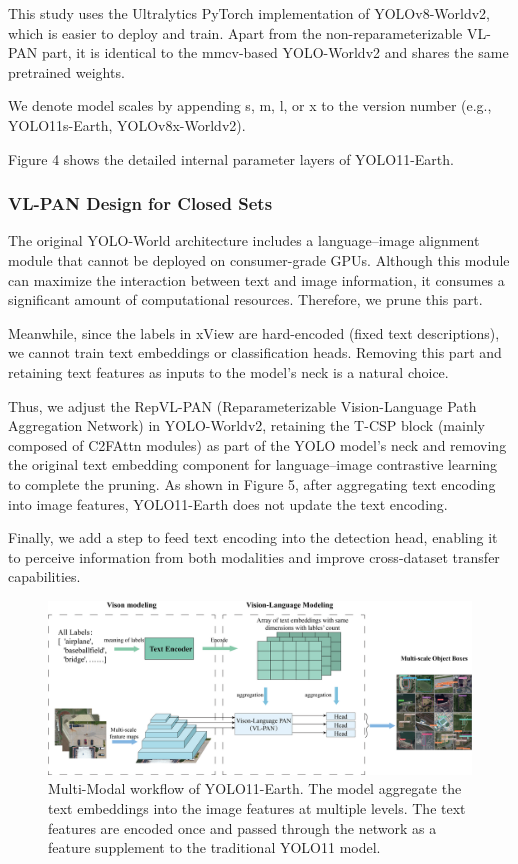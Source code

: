 \documentclass{article}
\begin{document}
This study uses the Ultralytics PyTorch implementation of YOLOv8-Worldv2, which is easier to deploy and train.  
Apart from the non-reparameterizable VL-PAN part, it is identical to the mmcv-based YOLO-Worldv2 and shares  
the same pretrained weights.

We denote model scales by appending s, m, l, or x to the version number (e.g., YOLO11s-Earth, YOLOv8x-Worldv2).

Figure 4 shows the detailed internal parameter layers of YOLO11-Earth.

\subsubsection{VL-PAN Design for Closed Sets}
The original YOLO-World architecture includes a
language–image alignment module that cannot be
deployed on consumer-grade GPUs. Although this
module can maximize the interaction between text
and image information, it consumes a significant
amount of computational resources. Therefore,
we prune this part.

Meanwhile, since the labels in xView are
hard-encoded (fixed text descriptions), we cannot
train text embeddings or classification heads.
Removing this part and retaining text features as
inputs to the model’s neck is a natural choice.

Thus, we adjust the RepVL-PAN
(Reparameterizable Vision-Language Path
Aggregation Network) in YOLO-Worldv2, retaining
the T-CSP block (mainly composed of C2FAttn modules)
as part of the YOLO model’s neck and removing the
original text embedding component for language–image
contrastive learning to complete the pruning. 
As shown in Figure 5, after aggregating text encoding
into image features, YOLO11-Earth does not update the text
encoding.

Finally, we add a step to feed text encoding into
the detection head, enabling it to perceive information
from both modalities and improve cross-dataset
transfer capabilities.

\begin{figure}[htbp]
    \centering
    \includegraphics[width=12cm]{../image/5.png}
    \caption{Multi-Modal workflow of YOLO11-Earth. The model aggregate the text embeddings into the image features at multiple levels. The text features are encoded once and passed through the network as a feature supplement to the traditional YOLO11 model.}
\end{figure}
\end{document}
